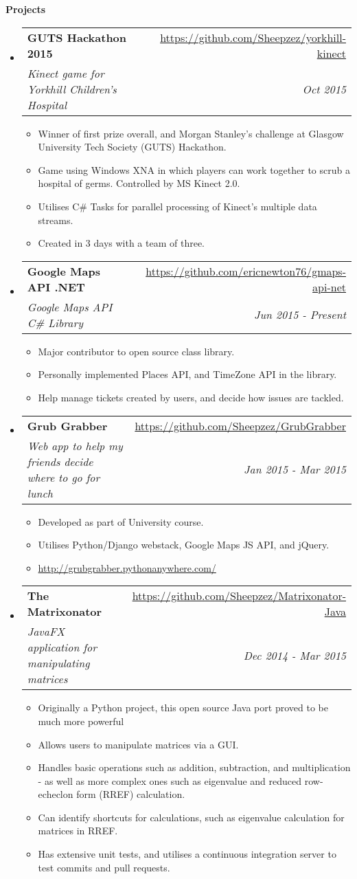 \documentclass[letterpaper,11pt]{article}
\makeatletter
\newcommand{\resitem}[1]{\item #1 \vspace{-2pt}}
\newcommand{\resheading}[1]{{\large \colorbox{mygrey}{\begin{minipage}{\textwidth}{\textbf{#1 \vphantom{p\^{E}}}}\end{minipage}}}}
\newcommand{\ressubheading}[4]{
\begin{tabular*}{7.0in}{l@{\extracolsep{\fill}}r}
	\textbf{#1} & #2 \\
	\textit{#3} & \textit{#4} \\
\end{tabular*}\vspace{-6pt}}
\makeatother
\begin{document}
	\pagebreak

	\resheading{Projects}
	\begin{itemize}
		\item
		\ressubheading{GUTS Hackathon 2015}{\url{https://github.com/Sheepzez/yorkhill-kinect}}
		{Kinect game for Yorkhill Children's Hospital}{Oct 2015}
		\begin{itemize}
			\resitem{Winner of first prize overall, and Morgan Stanley's challenge at Glasgow University Tech Society (GUTS) Hackathon.}
			\resitem{Game using Windows XNA in which players can work together to scrub a hospital of germs. Controlled by MS Kinect 2.0.}
			\resitem{Utilises C\# Tasks for parallel processing of Kinect's multiple data streams.}
			\resitem{Created in 3 days with a team of three.}
		\end{itemize}

		\item
		\ressubheading{Google Maps API .NET}{\url{https://github.com/ericnewton76/gmaps-api-net}}
		{Google Maps API C\# Library}{Jun 2015 - Present}
		\begin{itemize}
			\resitem{Major contributor to open source class library.}
			\resitem{Personally implemented Places API, and TimeZone API in the library.}
			\resitem{Help manage tickets created by users, and decide how issues are tackled.}
		\end{itemize}

		\item
		\ressubheading{Grub Grabber}{\url{https://github.com/Sheepzez/GrubGrabber}}
		{Web app to help my friends decide where to go for lunch}{Jan 2015 - Mar 2015}
		\begin{itemize}
			\resitem{Developed as part of University course.}
			\resitem{Utilises Python/Django webstack, Google Maps JS API, and jQuery.}
			\resitem{\url{http://grubgrabber.pythonanywhere.com/}}
		\end{itemize}

		\item
		\ressubheading{The Matrixonator}{\url{https://github.com/Sheepzez/Matrixonator-Java}}
		{JavaFX application for manipulating matrices}{Dec 2014 - Mar 2015}
		\begin{itemize}
			\resitem{Originally a Python project, this open source Java port proved to be much more powerful}
			\resitem{Allows users to manipulate matrices via a GUI.}
			\resitem{Handles basic operations such as addition, subtraction, and multiplication - as well as
			more complex ones such as eigenvalue and reduced row-echeclon form (RREF) calculation.}
			\resitem{Can identify shortcuts for calculations, such as eigenvalue calculation for matrices in RREF.}
			\resitem{Has extensive unit tests, and utilises a continuous integration server to test commits and pull requests.}
		\end{itemize}

	\end{itemize}
\end{document}
